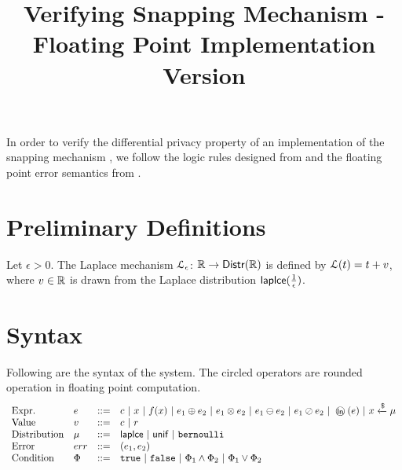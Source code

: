 \documentclass[a4paper,11pt]{article}
\begin{document}
\title{Verifying Snapping Mechanism - Floating Point Implementation Version}
\author{}

\date{}

\maketitle
In order to verify the differential privacy property of an implementation of the snapping mechanism \cite{mironov2012significance}, we follow the logic rules designed from \cite{barthe2016proving} and the floating point error semantics from \cite{Ramananandro2016unified,Martel2006higher,Becker2018verified,Moscato2017Automatic}.

\section{Preliminary Definitions}
\begin{defn}
Let $\epsilon > 0$. The Laplace mechanism  $\mathcal{L}_{\epsilon}$: $\mathbb{R} \to \mathsf{Distr}(\mathbb{R})$ is defined by $\mathcal{L}(t) = t + v$, where $v \in \mathbb{R}$ is drawn from the Laplace distribution $\mathsf{laplce}(\frac{1}{\epsilon})$.
\end{defn}




\section{Syntax}
Following are the syntax of the system. The circled operators are rounded operation in floating point computation.
\[\begin{array}{llll}
\mbox{Expr.} & \expr & ::= & \eflconst
	~|~ x ~|~ f(x) ~|~ \expr_1 \oplus \expr_2 
	~|~ \expr_1 \otimes \expr_2 ~|~ \expr_1 \ominus \expr_2 
	~|~ \expr_1 \oslash \expr_2 ~|~ \oln (\expr) ~|~ x \samplel \edistr \\
%
\mbox{Value} & \valr & ::= & \eflconst ~|~  \erlconst \\
%
\mbox{Distribution} & \edistr & ::= & \laplace ~|~ \uniform ~|~ \bernoulli \\ 
%
\mbox{Error} & \err & ::= & (\expr_1, \expr_2) \\

\mbox{Condition} & \condition & ::= & 
	\etrue ~|~ \efalse ~|~ \condition_1 \land \condition_2 
	~|~ \condition_1 \lor \condition_2

\end{array}\]
\end{document}
